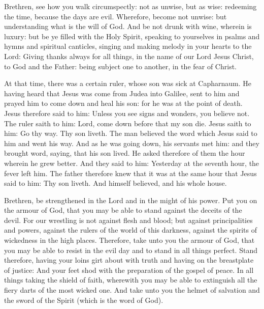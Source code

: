 


Brethren, see how you walk circumspectly: not as
unwise,
but as wise: redeeming the time, because the days are evil.
Wherefore, become not unwise: but understanding what is the will
of God.
And be not drunk with wine, wherein is luxury: but be ye filled
with the Holy Spirit,
speaking to yourselves in psalms and hymns and spiritual
canticles, singing and making melody in your hearts to the Lord:
Giving thanks always for all things, in the name of our Lord Jesus
Christ, to God and the Father:
being subject one to another, in the fear of Christ.



At that time, %
there was a certain ruler, whose son was sick at
Capharnaum.
He having heard that Jesus was come from Judea into Galilee, sent
to him and prayed him to come down and heal his son: for he was at the
point of death.
Jesus therefore said to him: Unless you see signs and wonders, you
believe not.
The ruler saith to him: Lord, come down before that my son die.
Jesus saith to him: Go thy way. Thy son liveth. The man believed
the word which Jesus said to him and went his way.
And as he was going down, his servants met him: and they brought
word, saying, that his son lived.
He asked therefore of them the hour wherein he grew better.  And
they said to him: Yesterday at the seventh hour, the fever left him.
The father therefore knew that it was at the same hour that Jesus
said to him: Thy son liveth. And himself believed, and his whole house.





Brethren, be strengthened in the Lord and in the might of
his power.
Put you on the armour of God, that you may be able to stand
against the deceits of the devil.
For our wrestling is not against flesh and blood; but against
principalities and powers, against the rulers of the world of this
darkness, against the spirits of wickedness in the high places.
Therefore, take unto you the armour of God, that you may be able
to resist in the evil day and to stand in all things perfect.
Stand therefore, having your loins girt about with truth and
having on the breastplate of justice:
And your feet shod with the preparation of the gospel of peace.
In all things taking the shield of faith, wherewith you may be
able to extinguish all the fiery darts of the most wicked one.
And take unto you the helmet of salvation and the sword of the
Spirit (which is the word of God).



